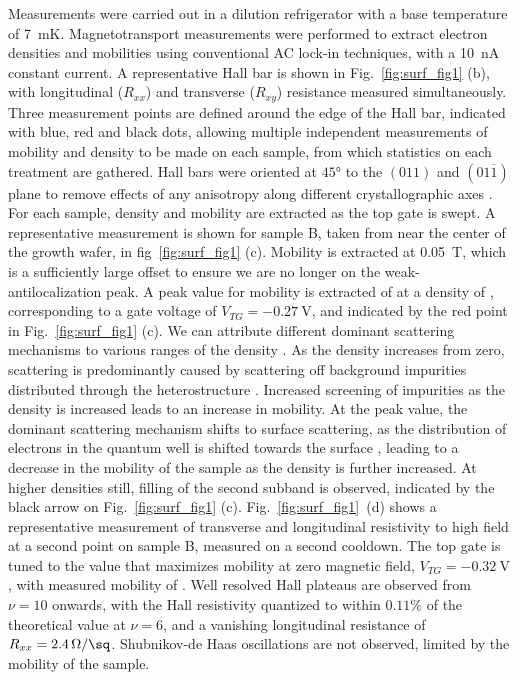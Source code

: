 Measurements were carried out in a dilution refrigerator with a base temperature of \SI{7}{\milli\kelvin}. Magnetotransport measurements were performed to extract electron densities and mobilities using conventional AC lock-in techniques, with a \SI{10}{\nano\ampere} constant current. A representative Hall bar is shown in Fig.~\ref{fig:surf_fig1} (b), with longitudinal ($R_{xx}$) and transverse ($R_{xy}$) resistance measured simultaneously. Three measurement points are defined around the edge of the Hall bar, indicated with blue, red and black dots, allowing multiple independent measurements of mobility and density to be made on each sample, from which statistics on each treatment are gathered. Hall bars were oriented at $\ang{45}$ to the $(011)$ and $(01\overline{1})$ plane to remove effects of any anisotropy along different crystallographic axes \cite{PhysRevB.67.045309,PhysRevB.77.235307}. For each sample, density and mobility are extracted as the top gate is swept. A representative measurement is shown for sample B, taken from near the center of the growth wafer, in fig~\ref{fig:surf_fig1} (c). Mobility is extracted at \SI{0.05}{\tesla}, which is a sufficiently large offset to ensure we are no longer on the weak-antilocalization peak. A peak value for mobility is extracted of  at a density of , corresponding to a gate voltage of $V_{TG} = \SI{-0.27}{\volt}$, and indicated by the red point in Fig.~\ref{fig:surf_fig1} (c). We can attribute different dominant scattering mechanisms to various ranges of the density \cite{Matsumoto_1974,PhysRevB.32.8126,PhysRevB.16.4446}. As the density increases from zero, scattering is predominantly caused by scattering off background impurities distributed through the heterostructure \cite{scattering}. Increased screening of impurities as the density is increased leads to an increase in mobility. At the peak value, the dominant scattering mechanism shifts to surface scattering, as the distribution of electrons in the quantum well is shifted towards the surface \cite{doi:10.1063/1.119829,PhysRevB.93.235312}, leading to a decrease in the mobility of the sample as the density is further increased. At higher densities still, filling of the second subband is observed, indicated by the black arrow on Fig.~\ref{fig:surf_fig1} (c). Fig.~\ref{fig:surf_fig1}~(d) shows a representative measurement of transverse and longitudinal resistivity to high field at a second point on sample B, measured on a second cooldown. The top gate is tuned to the value that maximizes mobility at zero magnetic field, $V_{TG} = \SI{-0.32}{\volt}$, with measured mobility of . Well resolved Hall plateaus are observed from $\nu = 10$ onwards, with the Hall resistivity quantized to within $0.11\%$ of the theoretical value at $\nu = 6$, and a vanishing longitudinal resistance of $R_{xx} = \SI[per-mode=symbol]{2.4}{\ohm\per\sq}$. Shubnikov-de Haas oscillations are not observed, limited by the mobility of the sample.

